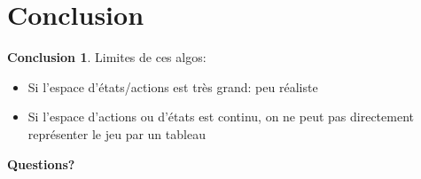 \documentclass{beamer}	%
\theoremstyle{plain}
\theoremstyle{definition}
\newtheorem{concl}{Conclusion}[section]
\theoremstyle{remark}
\numberwithin{equation}{section}
\begin{document}
\section{Conclusion}
\begin{frame}
\begin{concl}
Limites de ces algos:
\begin{itemize}
    \item Si l'espace d'états/actions est très grand: peu réaliste
    \item Si l'espace d'actions ou d'états est continu, on ne peut pas directement représenter le jeu par un tableau
    
\end{itemize}
\end{concl}
\end{frame}


\begin{frame}
\begin{center} {\bfseries \Large Questions?} \end{center}
\end{frame}
\end{document}
